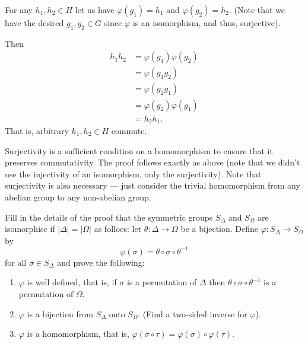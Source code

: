\documentclass[12 pt, letterpaper]{hmcpset}
\begin{document}
\begin{solution}
	For any $h_1, h_2 \in H$ let us have $\varphi(g_1) = h_1$ and $\varphi(g_2) = h_2$. (Note that we have the desired $g_1, g_2 \in G$ since $\varphi$ is an isomorphism, and thus, surjective). 

	Then
	\[
		\begin{split}
			h_1 h_2 & = \varphi(g_1) \varphi(g_2) \\
				& = \varphi(g_1 g_2) \\
				& = \varphi(g_2 g_1) \\
				& = \varphi(g_2) \varphi(g_1) \\
				& = h_2 h_1.
		\end{split}
	\]
	That is, arbitrary $h_1, h_2 \in H$ commute. 

	Surjectivity is a sufficient condition on a homomorphism to ensure that it preserves commutativity. The proof follows exactly as above (note that we didn't use the injectivity of an isomorphism, only the surjectivity). Note that surjectivity is also necessary --- just consider the trivial homomorphism from any abelian group to any non-abelian group.
\end{solution}

\pagebreak

\begin{problem}
	Fill in the details of the proof that the symmetric groups $S_\Delta$ and $S_\Omega$ are isomorphisc if $\lvert \Delta \rvert = \lvert \Omega \rvert$ as folloes: let $\theta : \Delta \to \Omega$ be a bijection. Define $\varphi : S_\Delta \to S_\Omega$ by
	\[
		\varphi(\sigma) = \theta \circ \sigma \circ \theta^{-1}
	\]
	for all $\sigma \in S_\Delta$ and prove the following:
	\begin{enumerate}
		\item
			$\varphi$ is well defined, that is, if $\sigma$ is a permutation of $\Delta$ then $\theta \circ \sigma \circ \theta^{-1}$ is a permutation of $\Omega$.
		\item
			$\varphi$ is a bijection from $S_\Delta$ onto $S_\Omega$. (Find a two-sided inverse for $\varphi$).
		\item
			$\varphi$ is a homomorphism, that is, $\varphi(\sigma \circ \tau) = \varphi(\sigma) \circ \varphi(\tau)$.
	\end{enumerate}
\end{problem}
\end{document}
